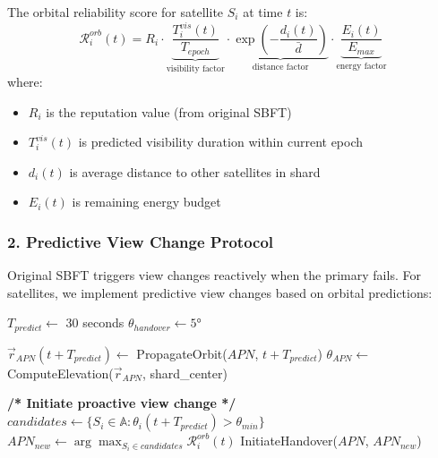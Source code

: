 \begin{definition}
The orbital reliability score for satellite $S_i$ at time $t$ is:
\begin{equation}
\mathcal{R}^{orb}_i(t) = R_i \cdot \underbrace{\frac{T^{vis}_i(t)}{T_{epoch}}}_{\text{visibility factor}} \cdot \underbrace{\exp\left(-\frac{d_i(t)}{\bar{d}}\right)}_{\text{distance factor}} \cdot \underbrace{\frac{E_i(t)}{E_{max}}}_{\text{energy factor}}
\end{equation}
where:
\begin{itemize}
    \item $R_i$ is the reputation value (from original SBFT)
    \item $T^{vis}_i(t)$ is predicted visibility duration within current epoch
    \item $d_i(t)$ is average distance to other satellites in shard
    \item $E_i(t)$ is remaining energy budget
\end{itemize}
\end{definition}

\subsubsection{2. Predictive View Change Protocol}

Original SBFT triggers view changes reactively when the primary fails. For satellites, we implement predictive view changes based on orbital predictions:

\begin{algorithm}[H] \small
\caption{Predictive View Change for Satellite Networks}
\label{alg:predictive_view_change}
\begin{algorithmic}[1]
\State $T_{predict} \leftarrow$ 30 seconds 
\State $\theta_{handover} \leftarrow 5°$ 

    \State $\vec{r}_{APN}(t + T_{predict}) \leftarrow$ PropagateOrbit($APN$, $t + T_{predict}$)
    \State $\theta_{APN} \leftarrow$ ComputeElevation($\vec{r}_{APN}$, shard\_center)
    
        \State \textbf{/* Initiate proactive view change */}
        \State $candidates \leftarrow \{S_i \in \mathbb{A} : \theta_i(t + T_{predict}) > \theta_{min}\}$
        \State $APN_{new} \leftarrow \arg\max_{S_i \in candidates} \mathcal{R}^{orb}_i(t)$
        \State InitiateHandover($APN$, $APN_{new}$)
    \EndIf
\EndFor
\end{algorithmic}
\end{algorithm}

